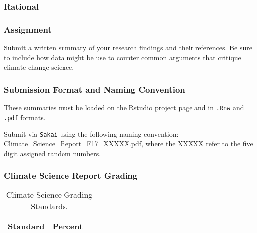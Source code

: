 
\subsubsection{Rational}

\subsubsection{Assignment}



Submit a written summary of your research findings and their references. Be sure to include how data might be use to counter common arguments that critique climate change science. 

\subsubsection{Submission Format and Naming Convention}

These summaries must be loaded on the Rstudio project page and in \texttt{.Rnw} and \texttt{.pdf} formats. 

Submit via \texttt{Sakai} using the following naming convention: Climate\_Science\_Report\_F17\_XXXXX.pdf, where the XXXXX refer to the five digit \href{https://github.com/marclos/Climate_Change_Narratives/raw/master/Admin/RandomNumbers.pdf}{assigned random numbers}.

\subsubsection{Climate Science Report Grading}

\begin{table}[h]
\caption{Climate Science Grading Standards.}
\label{tab:climatesciencereportgrading}
\begin{tabular}{lll}\hline
Standard      &   Percent   & \\ \hline\hline
\hline
\end{tabular}
\end{table}

